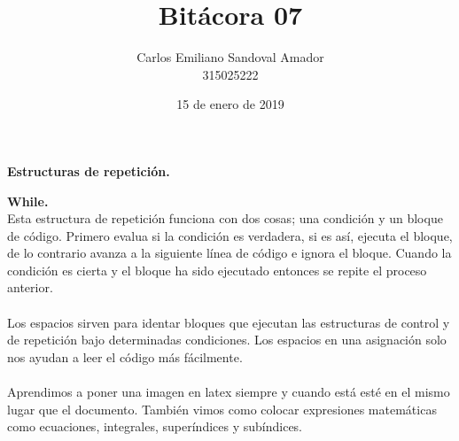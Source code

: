 \documentclass[letterpaper, 12pt, oneside]{article}%
\title{Bitácora 07}
\author{Carlos Emiliano Sandoval Amador \\ 315025222}
\date{15 de enero de 2019}
\begin{document}
	\maketitle
	\begin{center} %
		\textbf{\Large Estructuras de repetición.} %
	\end{center}
	\textbf{While.} \\
	 Esta estructura de repetición funciona con dos cosas; una condición y un bloque de código. Primero evalua si la condición es verdadera, si es así, ejecuta el bloque, de lo contrario avanza a la siguiente línea de código e ignora el bloque. Cuando la condición es cierta y el bloque ha sido ejecutado entonces se repite el proceso anterior.  \\ \\ 
	 Los espacios sirven para identar bloques que ejecutan las estructuras de control y de repetición bajo determinadas condiciones. Los espacios en una asignación solo nos ayudan a leer el código más fácilmente. \\ \\ Aprendimos a poner una imagen en latex siempre y cuando está esté en el mismo lugar que el documento. También vimos como colocar expresiones matemáticas como ecuaciones, integrales, superíndices y subíndices.
\end{document}
